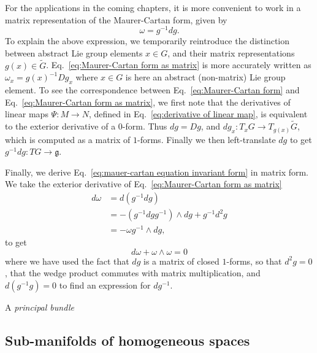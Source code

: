 For the applications in the coming chapters, it is more convenient to work in a matrix representation of the Maurer-Cartan form, given by
\begin{equation} \label{eq:Maurer-Cartan form as matrix}
\omega = g^{-1} dg.
\end{equation}
To explain the above expression, we temporarily reintroduce the distinction between abstract Lie group elements $x \in G$, and their matrix representations $g(x) \in \tilde{G}$. Eq.~\ref{eq:Maurer-Cartan form as matrix} is more accurately written as $\omega_x = g(x)^{-1} Dg_x$ where $x \in G$ is here an abstract (non-matrix) Lie group element. To see the correspondence between Eq.~\ref{eq:Maurer-Cartan form} and Eq.~\ref{eq:Maurer-Cartan form as matrix}, we first note that the derivatives of linear maps $\Psi : M \to N$, defined in Eq.~\ref{eq:derivative of linear map}, is equivalent to the exterior derivative of a $0$-form. Thus $dg = Dg$, and $dg_x : T_x G \to T_{g(x)} \tilde{G}$, which is computed as a matrix of $1$-forms. Finally we then left-translate $dg$ to get $g^{-1} dg : TG \to \mathfrak{g}$.

Finally, we derive Eq.~\ref{eq:mauer-cartan equation invariant form} in matrix form. We take the exterior derivative of Eq.~\ref{eq:Maurer-Cartan form as matrix}
\begin{equation} \label{eq:Mauer-Cartan equation in matrix form}
\begin{aligned}
d \omega & = d(g^{-1} dg) \\
& = - (g^{-1} dg g^{-1}) \wedge dg + g^{-1} d^2 g \\
& = - \omega g^{-1} \wedge dg,
\end{aligned}
\end{equation}
to get
\begin{equation}
d \omega + \omega \wedge \omega = 0
\end{equation}
where we have used the fact that $dg$ is a matrix of closed $1$-forms, so that $d^2 g=0$, that the wedge product commutes with matrix multiplication, and $d(g^{-1} g) = 0$ to find an expression for $d g^{-1}$.

A \textit{principal bundle} 

\subsection{Sub-manifolds of homogeneous spaces} \label{sec:Sub-manifolds of homogeneous spaces}

